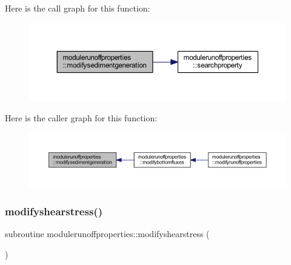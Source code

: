 Here is the call graph for this function\+:\nopagebreak
\begin{figure}[H]
\begin{center}
\leavevmode
\includegraphics[width=350pt]{namespacemodulerunoffproperties_a0edf1338341bbf4f8702def7a1f71c32_cgraph}
\end{center}
\end{figure}
Here is the caller graph for this function\+:\nopagebreak
\begin{figure}[H]
\begin{center}
\leavevmode
\includegraphics[width=350pt]{namespacemodulerunoffproperties_a0edf1338341bbf4f8702def7a1f71c32_icgraph}
\end{center}
\end{figure}
\mbox{\label{namespacemodulerunoffproperties_aab15f42e0b7672bdfdff651ff710415c}} 
\subsubsection{\texorpdfstring{modifyshearstress()}{modifyshearstress()}}
{\footnotesize\ttfamily subroutine modulerunoffproperties\+::modifyshearstress (\begin{DoxyParamCaption}{ }\end{DoxyParamCaption})\hspace{0.3cm}{\ttfamily [private]}}


